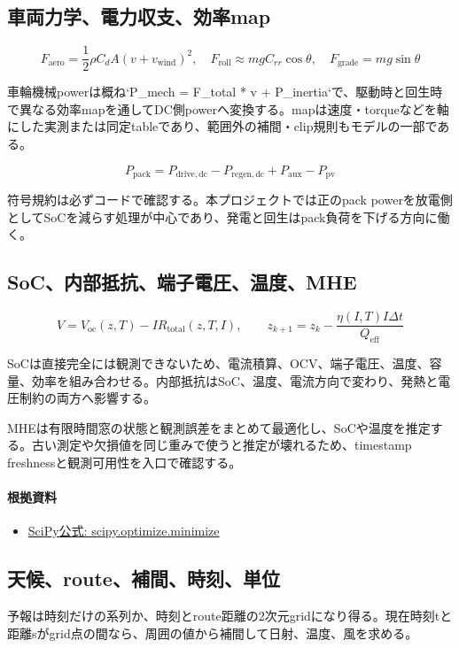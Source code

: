 \documentclass[a4paper,11pt]{article}
\begin{document}
\subsection{車両力学、電力収支、効率map}
\[
F_{\mathrm{aero}}=\frac{1}{2}\rho C_dA(v+v_{\mathrm{wind}})^2,\quad F_{\mathrm{roll}}\approx mgC_{rr}\cos\theta,\quad F_{\mathrm{grade}}=mg\sin\theta
\]

車輪機械powerは概ね`P\_mech = F\_total * v + P\_inertia`で、駆動時と回生時で異なる効率mapを通してDC側powerへ変換する。mapは速度・torqueなどを軸にした実測または同定tableであり、範囲外の補間・clip規則もモデルの一部である。


\[
P_{\mathrm{pack}}=P_{\mathrm{drive,dc}}-P_{\mathrm{regen,dc}}+P_{\mathrm{aux}}-P_{\mathrm{pv}}
\]

符号規約は必ずコードで確認する。本プロジェクトでは正のpack powerを放電側としてSoCを減らす処理が中心であり、発電と回生はpack負荷を下げる方向に働く。



\subsection{SoC、内部抵抗、端子電圧、温度、MHE}
\[
V=V_{\mathrm{oc}}(z,T)-IR_{\mathrm{total}}(z,T,I),\qquad z_{k+1}=z_k-\frac{\eta(I,T)I\Delta t}{Q_{\mathrm{eff}}}
\]

SoCは直接完全には観測できないため、電流積算、OCV、端子電圧、温度、容量、効率を組み合わせる。内部抵抗はSoC、温度、電流方向で変わり、発熱と電圧制約の両方へ影響する。


MHEは有限時間窓の状態と観測誤差をまとめて最適化し、SoCや温度を推定する。古い測定や欠損値を同じ重みで使うと推定が壊れるため、timestamp freshnessと観測可用性を入口で確認する。

\paragraph{根拠資料}
\begin{itemize}[leftmargin=1.6em]
\item \href{https://docs.scipy.org/doc/scipy/reference/generated/scipy.optimize.minimize.html}{SciPy公式: scipy.optimize.minimize}
\end{itemize}

\subsection{天候、route、補間、時刻、単位}
予報は時刻だけの系列か、時刻とroute距離の2次元gridになり得る。現在時刻tと距離sがgrid点の間なら、周囲の値から補間して日射、温度、風を求める。
\end{document}
